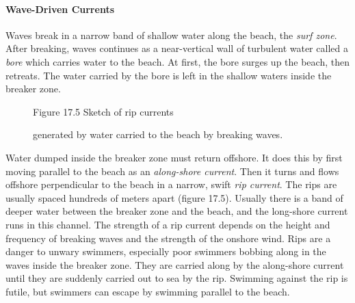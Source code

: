 \paragraph{Wave-Driven Currents}
Waves break in a
narrow band of shallow water along the beach, the \textit{surf
  zone}. After breaking, waves continues as a
near-vertical wall of turbulent water called a
\textit{bore} which carries water to the beach. At
first, the bore surges up the beach, then retreats. The water carried
by the bore is left in the shallow waters inside the
breaker zone.

\begin{figure}[b!]
\vspace{-2ex}
\centering
\footnotesize
Figure 17.5 Sketch of rip currents
\rule{0mm}{4ex}generated by water carried to the beach by breaking
waves.

\label{fig:rips}
\end{figure}

Water dumped inside the breaker zone must return offshore. It does this by first moving
parallel to the beach as an \textit{along-shore
  current}. Then it turns and flows
offshore perpendicular to the beach in a narrow, swift \textit{rip
  current}. The rips
are usually spaced hundreds of meters apart (figure 17.5). Usually
there is a band of deeper water between the breaker zone and the
beach, and the long-shore current runs in this channel. The strength
of a rip current depends on the height and
frequency of breaking waves and the strength of the onshore wind. Rips
are a danger to unwary swimmers, especially poor swimmers bobbing
along in the waves inside the breaker zone. They are carried along by
the along-shore current until they are suddenly carried out to sea by
the rip. Swimming against the rip is futile, but swimmers can escape
by swimming parallel to the beach.

